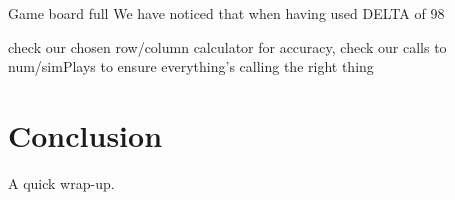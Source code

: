 \documentclass[letterpaper]{article}
\begin{document}
Game board full
	We have noticed that when having used DELTA of 98%

check our chosen row/column calculator for accuracy, check our calls to num/simPlays to ensure everything’s calling the right thing

\section{Conclusion}

A quick wrap-up.



\end{document}
